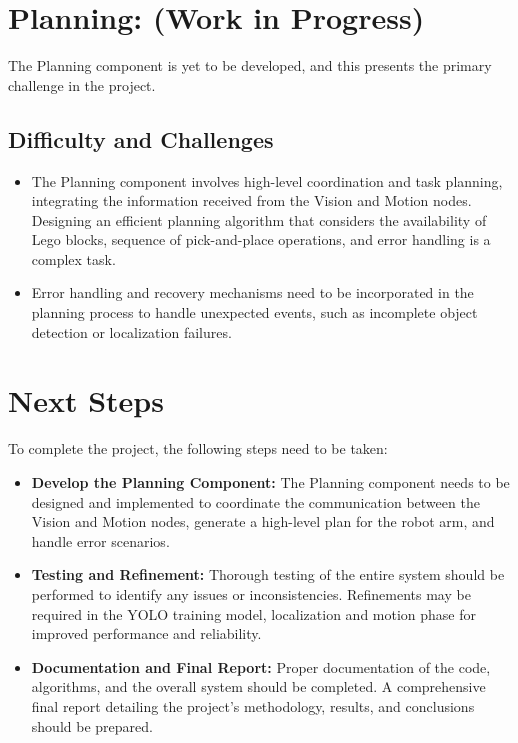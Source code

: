 \documentclass{article}
\begin{document}
	\section{Planning: (Work in Progress)}
	The Planning component is yet to be developed, and this presents the primary challenge in the project.
	
	\subsection{Difficulty and Challenges}
	\begin{itemize}
		\item The Planning component involves high-level coordination and task planning, integrating the information received from the Vision and Motion nodes. Designing an efficient planning algorithm that considers the availability of Lego blocks, sequence of pick-and-place operations, and error handling is a complex task.
		\item Error handling and recovery mechanisms need to be incorporated in the planning process to handle unexpected events, such as incomplete object detection or localization failures.
	\end{itemize}
	
	\section{Next Steps}
	To complete the project, the following steps need to be taken:
	
	\begin{itemize}
		\item \textbf{Develop the Planning Component:} The Planning component needs to be designed and implemented to coordinate the communication between the Vision and Motion nodes, generate a high-level plan for the robot arm, and handle error scenarios.
		\item \textbf{Testing and Refinement:} Thorough testing of the entire system should be performed to identify any issues or inconsistencies. Refinements may be required in the YOLO training model, localization and motion phase for improved performance and reliability.
		\item \textbf{Documentation and Final Report:} Proper documentation of the code, algorithms, and the overall system should be completed. A comprehensive final report detailing the project's methodology, results, and conclusions should be prepared.
	\end{itemize}
	
\end{document}
